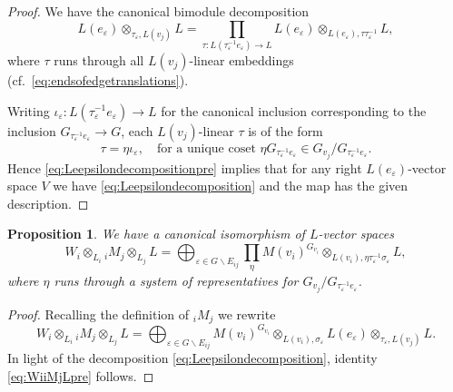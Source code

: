 \documentclass[a4paper,12pt,reqno]{amsart}
\theoremstyle{plain}
\newtheorem{proposition}[theorem]{Proposition}
\theoremstyle{remark}
\begin{document}
    \begin{proof}
    We have the canonical bimodule decomposition
    \begin{equation}
      L(e_\varepsilon)\otimes_{\tau_\varepsilon,L(v_j)}L
      =
      \prod_{\tau\colon L(\tau_\varepsilon^{-1}e_\varepsilon)\to L}
      L(e_\varepsilon)\otimes_{L(e_\varepsilon),\tau\tau_\varepsilon^{-1}}L,
      \label{eq:Leepsilondecompositionpre}
    \end{equation}
    where $\tau$ runs through all $L(v_j)$-linear embeddings (cf.\ \eqref{eq:endsofedgetranslations}).

    Writing $\iota_{\varepsilon}\colon L(\tau_\varepsilon^{-1}e_\varepsilon)\to L$ for the canonical inclusion corresponding to the inclusion $G_{\tau_\varepsilon^{-1}e_\varepsilon}\to G$, each $L(v_j)$-linear $\tau$ is of the form
    \[
    \tau=\eta\iota_{\varepsilon},\quad\text{for a unique coset }\eta G_{\tau_\varepsilon^{-1}e_\varepsilon} \in G_{v_j}/G_{\tau_\varepsilon^{-1}e_\varepsilon}.
    \]
    Hence \eqref{eq:Leepsilondecompositionpre} implies that for any right $L(e_\varepsilon)$-vector space $V$ we have \eqref{eq:Leepsilondecomposition} and the map has the given description.
    \end{proof}

    \begin{proposition}\label{prop:WiiMjLpre}
      We have a canonical isomorphism of $L$-vector spaces
    \begin{equation}
    W_i \otimes_{L_i} {}_iM_j\otimes_{L_j}L=
    \bigoplus_{\varepsilon\in G\backslash E_{ij}}
    \prod_{\eta}
    M(v_i)^{G_{v_i}} \otimes_{L(v_i),\eta\tau_\varepsilon^{-1}\sigma_\varepsilon}L,
    \label{eq:WiiMjLpre}
    \end{equation}
    where $\eta$ runs through a system of representatives for $G_{v_j}/G_{\tau_\varepsilon^{-1}e_\varepsilon}$.
    \end{proposition}

    \begin{proof}
    Recalling the definition of ${}_iM_j$ we rewrite
    \[
    W_i \otimes_{L_i} {}_iM_j\otimes_{L_j}L=
    \bigoplus_{\varepsilon\in G\backslash E_{ij}}
    M(v_i)^{G_{v_i}} \otimes_{L(v_i),\sigma_\varepsilon} L(e_\varepsilon)\otimes_{\tau_\varepsilon,L(v_j)}L.
    \]
    In light of the decomposition \eqref{eq:Leepsilondecomposition}, identity \eqref{eq:WiiMjLpre} follows.
    \end{proof}
\end{document}
